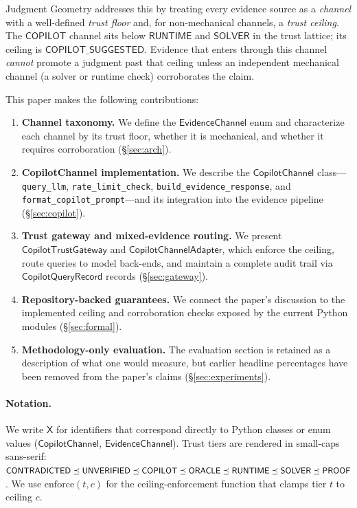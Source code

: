 \documentclass[11pt]{article}
\newcommand{\CopCh}{\mathsf{CopilotChannel}}
\newcommand{\EvCh}{\mathsf{EvidenceChannel}}
\newcommand{\CopAdapt}{\mathsf{CopilotChannelAdapter}}
\newcommand{\CopGate}{\mathsf{CopilotTrustGateway}}
\newcommand{\QRec}{\mathsf{CopilotQueryRecord}}
\newcommand{\TrustCeil}{\mathsf{COPILOT\_SUGGESTED}}
\newcommand{\enforce}{\mathrm{enforce}}
\newcommand{\queryLLM}{\texttt{query\_llm}}
\newcommand{\rateCheck}{\texttt{rate\_limit\_check}}
\newcommand{\buildResp}{\texttt{build\_evidence\_response}}
\newcommand{\fmtPrompt}{\texttt{format\_copilot\_prompt}}
\begin{document}
Judgment Geometry addresses this by treating every evidence source
as a \emph{channel} with a well-defined \emph{trust floor} and,
for non-mechanical channels, a \emph{trust ceiling}.  The
$\mathsf{COPILOT}$ channel sits below $\mathsf{RUNTIME}$ and
$\mathsf{SOLVER}$ in the trust lattice; its ceiling is
$\TrustCeil$.  Evidence that enters through this channel
\emph{cannot} promote a judgment past that ceiling unless an
independent mechanical channel (\eg a solver or runtime check)
corroborates the claim.

This paper makes the following contributions:

\begin{enumerate}[leftmargin=2em]
\item \textbf{Channel taxonomy.}
  We define the $\EvCh$ enum and characterize each channel by
  its trust floor, whether it is mechanical, and whether it
  requires corroboration (\S\ref{sec:arch}).

\item \textbf{CopilotChannel implementation.}
  We describe the $\CopCh$ class---\queryLLM, \rateCheck,
  \buildResp, and \fmtPrompt---and its integration into the
  evidence pipeline (\S\ref{sec:copilot}).

\item \textbf{Trust gateway and mixed-evidence routing.}
  We present $\CopGate$ and $\CopAdapt$, which enforce the
  ceiling, route queries to model back-ends, and maintain a
  complete audit trail via $\QRec$ records (\S\ref{sec:gateway}).

  \item \textbf{Repository-backed guarantees.}
  We connect the paper's discussion to the implemented ceiling and
  corroboration checks exposed by the current Python modules
  (\S\ref{sec:formal}).

 \item \textbf{Methodology-only evaluation.}
  The evaluation section is retained as a description of what one would
  measure, but earlier headline percentages have been removed from the
  paper's claims (\S\ref{sec:experiments}).
\end{enumerate}

\paragraph{Notation.}
We write $\mathsf{X}$ for identifiers that correspond directly to
Python classes or enum values (\eg $\CopCh$, $\EvCh$).
Trust tiers are rendered in small-caps sans-serif:
$\mathsf{CONTRADICTED} \preceq \mathsf{UNVERIFIED} \preceq \mathsf{COPILOT} \preceq \mathsf{ORACLE} \preceq
 \mathsf{RUNTIME} \preceq \mathsf{SOLVER} \preceq \mathsf{PROOF}$.
We use $\enforce(t,c)$ for the ceiling-enforcement function that
clamps tier $t$ to ceiling $c$.
\end{document}
